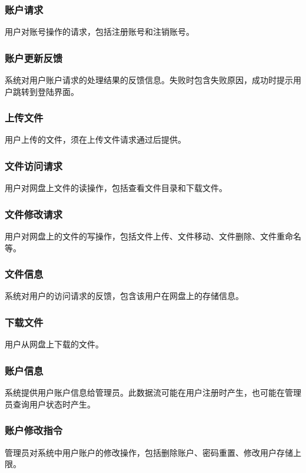 \subsubsection{账户请求}
用户对账号操作的请求，包括注册账号和注销账号。

\subsubsection{账户更新反馈}
系统对用户账户请求的处理结果的反馈信息。失败时包含失败原因，成功时提示用户跳转到登陆界面。

\subsubsection{上传文件}
用户上传的文件，须在上传文件请求通过后提供。

\subsubsection{文件访问请求}
用户对网盘上文件的读操作，包括查看文件目录和下载文件。

\subsubsection{文件修改请求}
用户对网盘上的文件的写操作，包括文件上传、文件移动、文件删除、文件重命名等。

\subsubsection{文件信息}
系统对用户的访问请求的反馈，包含该用户在网盘上的存储信息。

\subsubsection{下载文件}
用户从网盘上下载的文件。

\subsubsection{账户信息}
系统提供用户账户信息给管理员。此数据流可能在用户注册时产生，也可能在管理员查询用户状态时产生。

\subsubsection{账户修改指令}
管理员对系统中用户账户的修改操作，包括删除账户、密码重置、修改用户存储上限。

